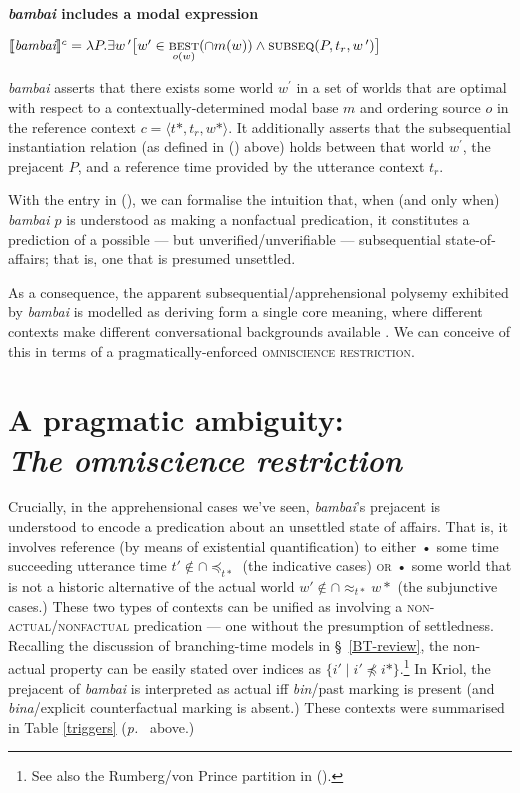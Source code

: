 \pex \textbf{\textit{bambai} includes a modal expression}

$\denote[c]{\textit{bambai}}=\lambda P.\exists w\,^\prime\big[w'\in\underset{o(w)}{\textsc{best}}(\cap m(w))\wedge\text{{\sc subseq}}(P,t_r,w\,^\prime)\big]$

\textit{bambai} asserts that there exists some world $w^\prime$ in a set of worlds that are optimal with respect to a contextually-determined modal base $m$ and ordering source $o$ in the reference context $c=\langle t*,t_r,w*\rangle$. It additionally asserts that the {\sc subsequential instantiation} relation (as defined in () above) holds between that world $w^\prime$, the prejacent $P$, and a reference time provided by the utterance context $t_r$.

\xe


With the entry in (\lastx), we can formalise the intuition that, when (and only when) \textit{bambai $p$} is understood as making a nonfactual predication, it constitutes a prediction of a possible --- but unverified/unverifiable --- subsequential state-of-affairs; that is, one that is presumed unsettled. 


As a consequence, the apparent subsequential/apprehensional polysemy exhibited by \textit{bambai} is modelled as deriving form a single core meaning, where different contexts make different conversational backgrounds available \citep[\textit{cf.}][55\textit{ff}]{Kratzer2012}. We can conceive of this in terms of a pragmatically-enforced \textsc{omniscience restriction.}


\section[The omniscience restriction]{A pragmatic ambiguity:\\\it The omniscience restriction}


 Crucially, in the apprehensional cases we've seen, \textit{bambai}'s prejacent is understood to encode a predication about an unsettled state of affairs. That is, it involves reference (by means of existential quantification) to either • some time  succeeding utterance time $ t'\notin\cap\preccurlyeq_{t*} $ (the indicative cases) \textsc{or} • some world that is not a historic alternative of the actual world $w'\notin\cap\approx_{t*}w* $ (the subjunctive cases.) These two types of contexts can be unified as involving a \textsc{non-actual}/\textsc{nonfactual} predication --- one without the presumption of settledness. Recalling the discussion of branching-time models in \S~\ref{BT-review}, the non-actual property can be easily stated over indices as $ \{i'\mid i'\not\preccurlyeq i*\} $.\footnote{See also the Rumberg/von Prince partition in ().} In Kriol, the prejacent of \textit{bambai} is interpreted as actual if{f} \textit{bin}/past marking is present (and \textit{bina}/explicit counterfactual marking is absent.) These contexts were summarised in Table \ref{triggers} (\textit{p.}~\pageref{triggers} above.)
 
